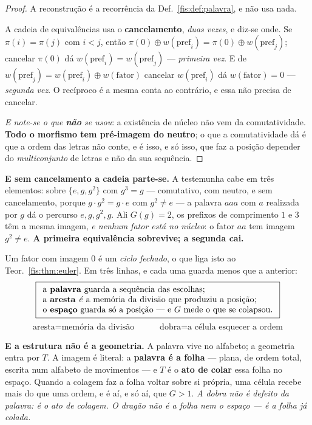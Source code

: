 \documentclass[livro.tex]{subfiles}
\begin{document}
\begin{proof}
A reconstrução é a recorrência da Def.~\ref{fis:def:palavra}, e não usa nada.

A cadeia de equivalências usa o \textbf{cancelamento}, \emph{duas vezes}, e
diz-se onde. Se $\pi(i)=\pi(j)$ com $i<j$, então
$\pi(0)\oplus w(\text{pref}_i)=\pi(0)\oplus w(\text{pref}_j)$; cancelar $\pi(0)$
dá $w(\text{pref}_i)=w(\text{pref}_j)$ --- \emph{primeira vez}. E de
$w(\text{pref}_j)=w(\text{pref}_i)\oplus w(\text{fator})$ cancelar
$w(\text{pref}_i)$ dá $w(\text{fator})=0$ --- \emph{segunda vez}. O recíproco é a
mesma conta ao contrário, e essa não precisa de cancelar.

\emph{E note-se o que \textbf{não} se usou}: a existência de núcleo não vem da
comutatividade. \textbf{Todo o morfismo tem pré-imagem do neutro}; o que a
comutatividade dá é que a ordem das letras não conte, e é isso, e só isso, que
faz a posição depender do \emph{multiconjunto} de letras e não da sua sequência.
\end{proof}

\medskip\noindent\textbf{E sem cancelamento a cadeia parte-se.} A testemunha
cabe em três elementos: sobre $\{e,g,g^{2}\}$ com $g^{3}=g$ --- comutativo, com
neutro, e sem cancelamento, porque $g\cdot g^{2}=g\cdot e$ com $g^{2}\neq e$ ---
a palavra $aaa$ com $a$ realizada por $g$ dá o percurso $e,g,g^{2},g$. Ali
$G(g)=2$, os prefixos de comprimento $1$ e $3$ têm a mesma imagem, \emph{e nenhum
fator está no núcleo}: o fator $aa$ tem imagem $g^{2}\neq e$. \textbf{A primeira
equivalência sobrevive; a segunda cai.}

\medskip\noindent Um fator com imagem $0$ é um \emph{ciclo fechado}, o que liga
isto ao Teor.~\ref{fis:thm:euler}. Em três linhas, e cada uma guarda menos que a
anterior:
\[
\boxed{
\begin{array}{l}
\text{a \textbf{palavra} guarda a sequência das escolhas;}\\
\text{a \textbf{aresta} \emph{é} a memória da divisão que produziu a posição;}\\
\text{o \textbf{espaço} guarda só a posição --- e }G\text{ mede o que se colapsou.}
\end{array}}
\]
\[
\boxed{\ \text{aresta}=\text{memória da divisão}\ }
\qquad
\boxed{\ \text{dobra}=\text{a célula esquecer a ordem}\ }
\]

\medskip\noindent\textbf{E a estrutura não é a geometria.} A palavra vive no
alfabeto; a geometria entra por $T$. A imagem é literal: a \textbf{palavra é a
folha} --- plana, de ordem total, escrita num alfabeto de movimentos --- e $T$ é
o \textbf{ato de colar} essa folha no espaço. Quando a colagem faz a folha voltar
sobre si própria, uma célula recebe mais do que uma ordem, e é aí, e só aí, que
$G>1$. \emph{A dobra não é defeito da palavra: é o ato de colagem. O dragão não é
a folha nem o espaço --- é a folha já colada.}
\end{document}
